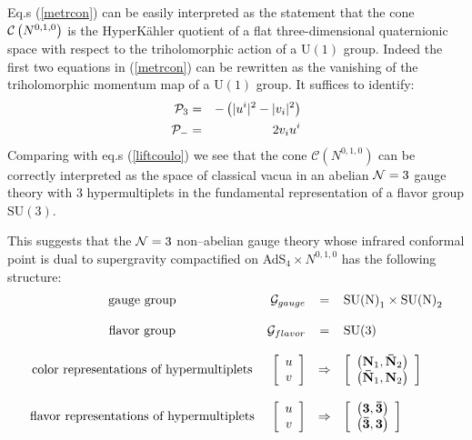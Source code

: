 \documentclass[a4paper,12pt]{article}
\def\n010{N^{0,1,0}}
\begin{document}
Eq.s (\ref{metrcon}) can be easily interpreted as the statement that
the cone ${\cal C}\left(\n010\right)$ is the HyperK\"ahler quotient of a
flat three-dimensional quaternionic space with respect to the
triholomorphic action of a $\mathrm{U(1)}$ group.
Indeed the first two equations in (\ref{metrcon}) can be rewritten as the
vanishing of the triholomorphic momentum map of a $\mathrm{U(1)}$ group.
It suffices to identify:
\begin{eqnarray}
{\cal P}_3 & = & -\left( |u^i|^2 -|v_i|^2 \right)  \nonumber\\
{\cal P}_- & =& 2 v_i u^i
\label{agniu1}
\end{eqnarray}
Comparing with eq.s (\ref{liftcoulo}) we see that the cone $\mathcal{C}
(\n010)$ can be correctly interpreted as the space of classical vacua
in an abelian ${\cal N}=3$ gauge theory with $3$ hypermultiplets in
the fundamental representation of a flavor group $\mathrm{SU(3)}$.
\par
This suggests that the ${\cal N}=3$ non--abelian gauge theory whose
infrared conformal point is dual to supergravity compactified on
AdS$_4 \times \n010$ has the following structure:
\begin{equation}
 \begin{array}{crcl}
   \mbox{gauge group} & \mathcal{ G}_{gauge} & = & \mathrm{SU(N)}_1 \times
   \mathrm{SU(N)}_2 \\
   \null & \null & \null & \null \\
   \mbox{flavor group} & \mathcal{G}_{flavor} & = & \mathrm{SU(3)}  \\
   \null & \null & \null & \null \\
   \mbox{color representations of hypermultiplets} & \left[ \begin{array}{c}
  u  \\
  v
\end{array} \right] & \Rightarrow & \left[ \begin{array}{c}
  \left({\bf N}_1,{\bf \bar N}_2\right)  \\
  \left({\bf \bar N}_1, {\bf N}_2\right)
\end{array} \right]  \\
\null & \null & \null & \null \\
\mbox{flavor representations of hypermultiplets} & \left[ \begin{array}{c}
  u  \\
  v
\end{array} \right] & \Rightarrow & \left[ \begin{array}{c}
  \left({\bf 3}, {\bf \bar 3}\right)  \\
 \left({\bf \bar 3}, {\bf 3} \right)
\end{array} \right]  \\
 \end{array}
\label{assegnati}
\end{equation}
\end{document}
